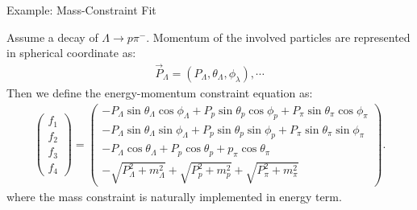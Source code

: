 \documentclass[
	xcolor=dvipsnames,
	10pt, 
	]{beamer}
\begin{document}
\begin{frame}{Example: Mass-Constraint Fit}
	\begin{block}{}
		Assume a decay of $\Lambda\to p\pi^-$. Momentum of the involved particles are represented in spherical coordinate as:
		\begin{align}
			\vec{P}_\Lambda = (P_\Lambda,\theta_\Lambda,\phi_\lambda),\cdots
		\end{align}
		Then we define the energy-momentum constraint equation as:
		\begin{align}
			\begin{pmatrix}
				f_1\\f_2\\f_3\\f_4
			\end{pmatrix}=
			\begin{pmatrix}
			-P_\Lambda\sin\theta_\Lambda\cos\phi_\Lambda+P_p\sin\theta_p\cos\phi_p+P_\pi\sin\theta_\pi\cos\phi_\pi\\
			-P_\Lambda\sin\theta_\Lambda\sin\phi_\Lambda+P_p\sin\theta_p\sin\phi_p+P_\pi\sin\theta_\pi\sin\phi_\pi\\
			-P_\Lambda\cos\theta_\Lambda+P_p\cos\theta_p+p_\pi\cos\theta_\pi\\
			-\sqrt{P_\Lambda^2+m_\Lambda^2}+\sqrt{P_p^2+m_p^2}+\sqrt{P_\pi^2+m_\pi^2}
			\end{pmatrix}.\label{FMat}
		\end{align}
		where the mass constraint is naturally implemented in energy term.
	\end{block}
\end{frame}
\end{document}
